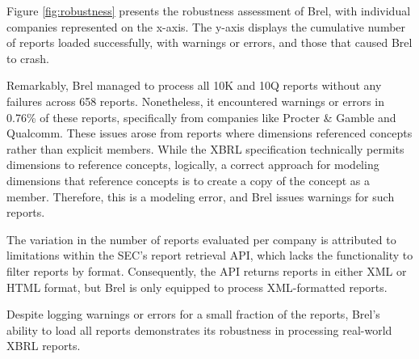 Figure \ref{fig:robustness} presents the robustness assessment of Brel, 
with individual companies represented on the x-axis.
The y-axis displays the cumulative number of reports loaded successfully, with warnings or errors, and those that caused Brel to crash.

Remarkably, Brel managed to process all 10K and 10Q reports without any failures across 658 reports.
Nonetheless, it encountered warnings or errors in 0.76\% of these reports, 
specifically from companies like Procter \& Gamble and Qualcomm. 
These issues arose from reports where dimensions referenced concepts rather than explicit members. 
While the XBRL specification technically permits dimensions to reference concepts, logically, 
a correct approach for modeling dimensions that reference concepts is to create a copy of the concept as a member. 
Therefore, this is a modeling error, and Brel issues warnings for such reports.

The variation in the number of reports evaluated per company is attributed to limitations within the SEC's report retrieval API, 
which lacks the functionality to filter reports by format. 
Consequently, the API returns reports in either XML or HTML format, but Brel is only equipped to process XML-formatted reports.

Despite logging warnings or errors for a small fraction of the reports, 
Brel's ability to load all reports demonstrates its robustness in processing real-world XBRL reports.
